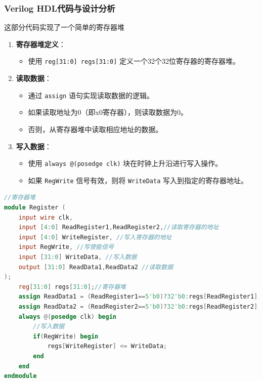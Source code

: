 \documentclass[12pt,hyperref,a4paper,UTF8]{ctexart}
\begin{document}
\subsubsection*{\Large Verilog HDL代码与设计分析}
\normalsize
这部分代码实现了一个简单的寄存器堆
\begin{enumerate}
    \item \textbf{寄存器堆定义}：
    \begin{itemize}
        \item 使用 \texttt{reg[31:0] regs[31:0]} 定义一个32个32位寄存器的寄存器堆。
    \end{itemize}

    \item \textbf{读取数据}：
    \begin{itemize}
        \item 通过 \texttt{assign} 语句实现读取数据的逻辑。
        \item 如果读取地址为0（即x0寄存器），则读取数据为0。
        \item 否则，从寄存器堆中读取相应地址的数据。
    \end{itemize}

    \item \textbf{写入数据}：
    \begin{itemize}
        \item 使用 \texttt{always @(posedge clk)} 块在时钟上升沿进行写入操作。
        \item 如果 \texttt{RegWrite} 信号有效，则将 \texttt{WriteData} 写入到指定的寄存器地址。
    \end{itemize}
\end{enumerate}




\begin{lstlisting}[language=Verilog,caption={寄存器堆}]
//寄存器堆
module Register (
    input wire clk,
    input [4:0] ReadRegister1,ReadRegister2,//读取寄存器的地址
    input [4:0] WriteRegister, //写入寄存器的地址
    input RegWrite, //写使能信号
    input [31:0] WriteData, //写入数据
    output [31:0] ReadData1,ReadData2 //读取数据
);
    reg[31:0] regs[31:0];//寄存器堆
    assign ReadData1 = (ReadRegister1==5'b0)?32'b0:regs[ReadRegister1];//x0寄存器始终为0,端口1读取
    assign ReadData2 = (ReadRegister2==5'b0)?32'b0:regs[ReadRegister2];//x0寄存器始终为0,端口2读取
    always @(posedge clk) begin
        //写入数据
        if(RegWrite) begin
            regs[WriteRegister] <= WriteData;
        end
    end
endmodule
\end{lstlisting}
\end{document}
